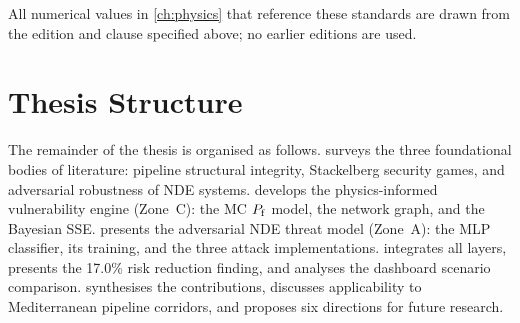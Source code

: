 \noindent All numerical values in \cref{ch:physics} that reference these
standards are drawn from the edition and clause specified above; no
earlier editions are used.

\section{Thesis Structure}
\label{sec:intro_structure}

The remainder of the thesis is organised as follows.
 surveys the three foundational bodies of literature:
pipeline structural integrity, Stackelberg security games, and adversarial
robustness of \ac{NDE} systems.
 develops the physics-informed vulnerability engine
(Zone~C): the \ac{MC} $P_{\mathrm{f}}$ model, the network graph, and the Bayesian
\ac{SSE}.
 presents the adversarial \ac{NDE} threat model
(Zone~A): the \ac{MLP} classifier, its training, and the three attack
implementations.
 integrates all layers, presents the 17.0\% risk
reduction finding, and analyses the dashboard scenario comparison.
 synthesises the contributions, discusses applicability
to Mediterranean pipeline corridors, and proposes six directions for
future research.
